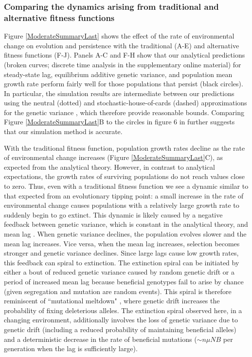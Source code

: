 \documentclass[12pt,letterpaper]{article} %
\begin{document}
\subsubsection*{Comparing the dynamics arising from traditional and alternative fitness functions}

Figure \ref{ModerateSummaryLast} shows the effect of the rate of environmental change on evolution and persistence with the traditional (A-E) and alternative fitness functions (F-J).
Panels A-C and F-H show that our analytical predictions (broken curves; discrete time analysis in the supplementary online material) for steady-state lag, equilibrium additive genetic variance, and population mean growth rate perform fairly well for those populations that persist (black circles).
In particular, the simulation results are intermediate between our predictions using the neutral (dotted) and stochastic-house-of-cards (dashed) approximations for the genetic variance \cite[equations 14 and 15 in][]{Burger1995}, which therefore provide reasonable bounds.
Comparing Figure \ref{ModerateSummaryLast}B to the circles in figure 6 in \cite{Burger1995} further suggests that our simulation method is accurate.

With the traditional fitness function, population growth rates decline as the rate of environmental change increases (Figure \ref{ModerateSummaryLast}C), as expected from the analytical theory.
However, in contrast to analytical expectations, the growth rates of surviving populations do not reach values close to zero.
Thus, even with a traditional fitness function we see a dynamic similar to that expected from an evolutionary tipping point: a small increase in the rate of environmental change causes populations with a relatively large growth rate to suddenly begin to go extinct.
This dynamic is likely caused by a negative feedback between genetic variance, which is constant in the analytical theory, and mean lag \citep[as described in][]{Burger1995}.
When genetic variance declines, the population evolves slower and the mean lag increases.
Vice versa, when the mean lag increases, selection becomes stronger and genetic variance declines.
Since large lags cause low growth rates, this feedback can spiral to extinction.
The extinction spiral can be initiated by either a bout of reduced genetic variance caused by random genetic drift or a period of increased mean lag because beneficial genotypes fail to arise by chance (given segregation and mutation are random events).    
This spiral is therefore reminiscent of ``mutational meltdown" \citep{Lynch1990}, where genetic drift increases the probability of fixing deleterious alleles.
The extinction spiral observed here, in a changing environment, additionally involves the loss of genetic variance due to genetic drift (including a reduced probability of maintaining beneficial alleles) and a deterministic decrease in the rate of beneficial mutations ($\sim n \mu N B$ per generation when the lag is sufficiently large).
\end{document}
